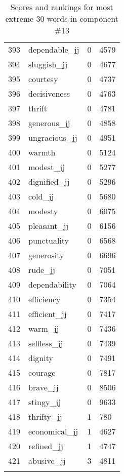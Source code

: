 \begin{longtable}[!htbp]{| rlr@{.}l |}
    393 & dependable\_jj & 0 & 4579 \\
    394 & sluggish\_jj & 0 & 4677 \\
    395 & courtesy & 0 & 4737 \\
    396 & decisiveness & 0 & 4763 \\
    397 & thrift & 0 & 4781 \\
    398 & generous\_jj & 0 & 4858 \\
    399 & ungracious\_jj & 0 & 4951 \\
    400 & warmth & 0 & 5124 \\
    401 & modest\_jj & 0 & 5277 \\
    402 & dignified\_jj & 0 & 5296 \\
    403 & cold\_jj & 0 & 5680 \\
    404 & modesty & 0 & 6075 \\
    405 & pleasant\_jj & 0 & 6156 \\
    406 & punctuality & 0 & 6568 \\
    407 & generosity & 0 & 6696 \\
    408 & rude\_jj & 0 & 7051 \\
    409 & dependability & 0 & 7064 \\
    410 & efficiency & 0 & 7354 \\
    411 & efficient\_jj & 0 & 7417 \\
    412 & warm\_jj & 0 & 7436 \\
    413 & selfless\_jj & 0 & 7439 \\
    414 & dignity & 0 & 7491 \\
    415 & courage & 0 & 7817 \\
    416 & brave\_jj & 0 & 8506 \\
    417 & stingy\_jj & 0 & 9633 \\
    418 & thrifty\_jj & 1 & 780 \\
    419 & economical\_jj & 1 & 4627 \\
    420 & refined\_jj & 1 & 4747 \\
    421 & abusive\_jj & 3 & 4811 \\
    \hline
    \caption{Scores and rankings for most extreme 30 words in component \#13} \\
\end{longtable}

